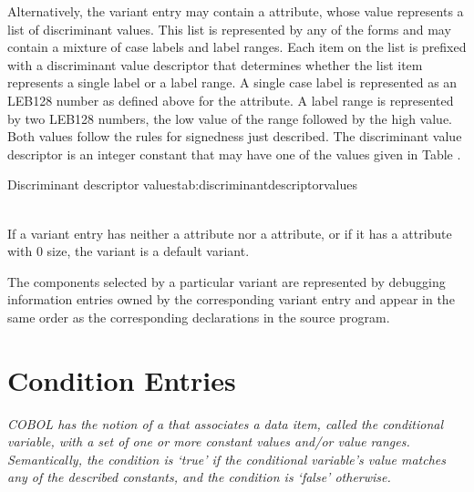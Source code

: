 Alternatively, 
\hypertarget{chap:DWATdiscrlistlistofdiscriminantvalues}{}
the variant entry may contain 
a 
\DWATdiscrlist{}
attribute, whose value represents a list of discriminant
values. This list is represented by any of the 
 forms and
may contain a mixture of case labels and label ranges. Each
item on the list is prefixed with a discriminant value
descriptor that determines whether the list item represents
a single label or a label range. A single case label is
represented as an LEB128 number as defined above for 
the
\DWATdiscrvalue{} 
attribute. A label range is represented by
two LEB128 numbers, the low value of the range followed by the
high value. Both values follow the rules for signedness just
described. The discriminant value descriptor is an integer
constant that may have one of the values given in 
Table .

\begin{simplenametable}[1.4in]{Discriminant descriptor values}{tab:discriminantdescriptorvalues}
\DWDSClabelTARG{} \\
\DWDSCrangeTARG{} \\
\end{simplenametable}

If a variant entry has neither a \DWATdiscrvalue{}
attribute nor a \DWATdiscrlist{} attribute, or if it has
a \DWATdiscrlist{} attribute with 0 size, the variant is a
default variant.

The components selected by a particular variant are represented
by debugging information entries owned by the corresponding
variant entry and appear in the same order as the corresponding
declarations in the source program.

\section{Condition Entries}
\label{chap:conditionentries}

\textit{COBOL has the notion of 
a  that
associates a data item, called the conditional variable, with
a set of one or more constant values and/or value ranges.
Semantically, the condition is \textquoteleft true\textquoteright{}
if the conditional
variable's value matches any of the described constants,
and the condition is \textquoteleft false\textquoteright{} otherwise.}

